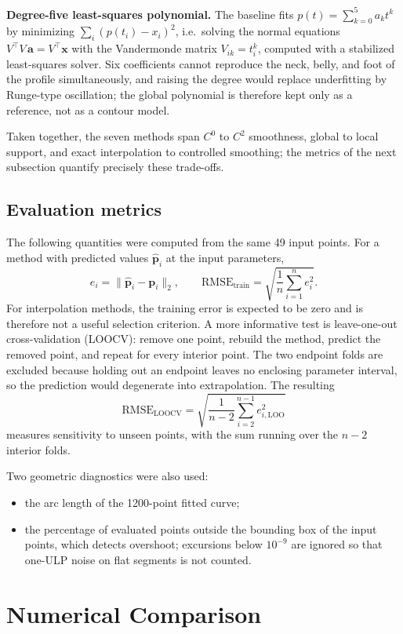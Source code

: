\documentclass[a4paper,11pt]{article}
\begin{document}
\textbf{Degree-five least-squares polynomial.}  The baseline fits
$p(t)=\sum_{k=0}^{5}a_k t^k$ by minimizing $\sum_i (p(t_i)-x_i)^2$, i.e.\ solving
the normal equations $V^\top V\,\bm a=V^\top \bm x$ with the Vandermonde matrix
$V_{ik}=t_i^k$, computed with a stabilized least-squares solver.  Six
coefficients cannot reproduce the neck, belly, and foot of the profile
simultaneously, and raising the degree would replace underfitting by
Runge-type oscillation; the global polynomial is therefore kept only as a
reference, not as a contour model.

Taken together, the seven methods span $C^0$ to $C^2$ smoothness, global to
local support, and exact interpolation to controlled smoothing; the metrics of
the next subsection quantify precisely these trade-offs.

\subsection{Evaluation metrics}

The following quantities were computed from the same 49 input points.
For a method with predicted values $\widehat{\bm p}_i$ at the input parameters,
\[
e_i=\|\widehat{\bm p}_i-\bm p_i\|_2,\qquad
\mathrm{RMSE}_{\mathrm{train}}
=\sqrt{\frac{1}{n}\sum_{i=1}^{n}e_i^2}.
\]
For interpolation methods, the training error is expected to be zero and is
therefore not a useful selection criterion.  A more informative test is
leave-one-out cross-validation (LOOCV): remove one point, rebuild the method,
predict the removed point, and repeat for every interior point.  The two
endpoint folds are excluded because holding out an endpoint leaves no
enclosing parameter interval, so the prediction would degenerate into
extrapolation.  The resulting
\[
\mathrm{RMSE}_{\mathrm{LOOCV}}
=\sqrt{\frac{1}{n-2}\sum_{i=2}^{n-1}e_{i,\mathrm{LOO}}^2}
\]
measures sensitivity to unseen points, with the sum running over the $n-2$
interior folds.

Two geometric diagnostics were also used:
\begin{itemize}
\item the arc length of the 1200-point fitted curve;
\item the percentage of evaluated points outside the bounding box of the input
  points, which detects overshoot; excursions below $10^{-9}$ are ignored so
  that one-ULP noise on flat segments is not counted.
\end{itemize}

\section{Numerical Comparison}
\end{document}
